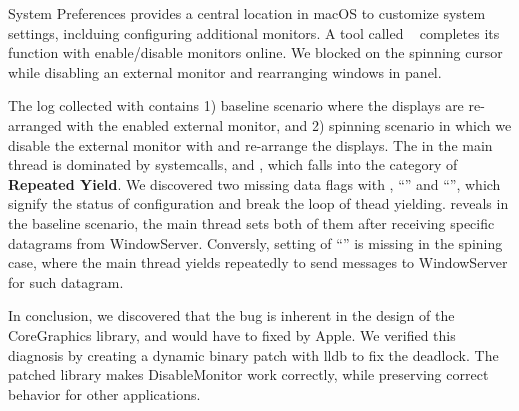 System Preferences provides a central location in macOS to customize
system settings, inclduing configuring additional monitors. A tool called
~\cite{disablemonitor} completes its function with enable/disable
monitors online. We blocked on the spinning cursor while disabling an external
monitor and rearranging windows in  panel.

The log collected with \xxx contains 1) baseline scenario where the displays
are re-arranged with the enabled external monitor, and 2) spinning scenario in
which we disable the external monitor with  and re-arrange
the displays. The \spinningnode in the main thread is dominated by systemcalls,
 and , which falls into the category of
\textbf{Repeated Yield}. We discovered two missing data flags with ,
``'' and ``'', which
signify the status of configuration and break the loop of thead yielding.
\xxx reveals in the baseline scenario, the main thread sets both of them
after receiving specific datagrams from WindowServer. Conversly, setting of
``'' is missing in the spining case, where the main
thread yields repeatedly to send messages to WindowServer for such datagram.

In conclusion, we discovered that the bug is inherent in the design of the
CoreGraphics library, and would have to fixed by Apple. We verified this
diagnosis by creating a dynamic binary patch with lldb to fix the deadlock. The
patched library makes DisableMonitor work correctly, while preserving correct
behavior for other applications.


